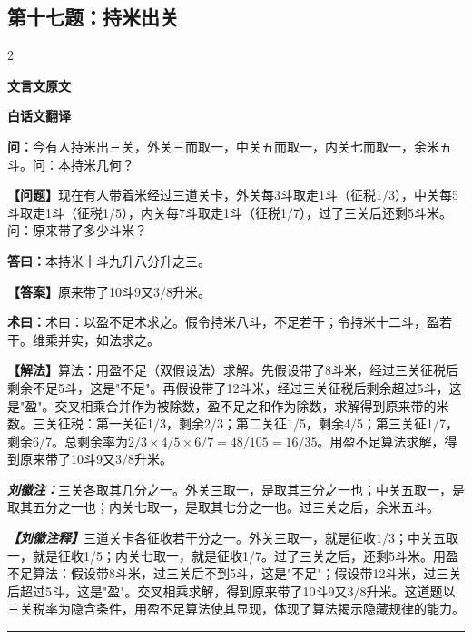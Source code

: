 \documentclass[10pt,a4paper]{article}
\newcommand{\wen}[1]{\textbf{\color{problemcolor}问：}#1\par}
\newcommand{\da}[1]{\textbf{答曰：}#1\par}
\newcommand{\shu}[1]{\textbf{术曰：}#1\par}
\newcommand{\liuhui}[1]{{\color{commentarycolor}\textit{\textbf{刘徽注：}}#1\par}}
\newcommand{\classicalheader}[1]{{\centering\large\bfseries\color{classicalcolor} #1\par\vspace{0.5em}}}
\newcommand{\wenmodern}[1]{\textbf{\color{moderncolor}【问题】}#1\par}
\newcommand{\damodern}[1]{\textbf{【答案】}#1\par}
\newcommand{\shumodern}[1]{\textbf{【解法】}#1\par}
\newcommand{\liuhuimodern}[1]{{\color{commentarycolor}\textit{\textbf{【刘徽注释】}}#1\par}}
\newcommand{\modernheader}[1]{{\centering\large\bfseries\color{moderncolor} #1\par\vspace{0.5em}}}
\newcommand{\problemsec}[1]{\subsection*{#1}}
\begin{document}
\problemsec{第十七题：持米出关}
\begin{paracol}{2}
\classicalheader{文言文原文}
\switchcolumn
\modernheader{白话文翻译}
\switchcolumn*

\wen{今有人持米出三关，外关三而取一，中关五而取一，内关七而取一，余米五斗。问：本持米几何？}

\switchcolumn

\wenmodern{现在有人带着米经过三道关卡，外关每3斗取走1斗（征税1/3），中关每5斗取走1斗（征税1/5），内关每7斗取走1斗（征税1/7），过了三关后还剩5斗米。问：原来带了多少斗米？}

\switchcolumn*

\da{本持米十斗九升八分升之三。}

\switchcolumn

\damodern{原来带了10斗9又3/8升米。}

\switchcolumn*

\shu{术曰：以盈不足术求之。假令持米八斗，不足若干；令持米十二斗，盈若干。维乘并实，如法求之。}

\switchcolumn

\shumodern{算法：用盈不足（双假设法）求解。先假设带了8斗米，经过三关征税后剩余不足5斗，这是"不足"。再假设带了12斗米，经过三关征税后剩余超过5斗，这是"盈"。交叉相乘合并作为被除数，盈不足之和作为除数，求解得到原来带的米数。三关征税：第一关征1/3，剩余2/3；第二关征1/5，剩余4/5；第三关征1/7，剩余6/7。总剩余率为$2/3 \times 4/5 \times 6/7 = 48/105 = 16/35$。用盈不足算法求解，得到原来带了10斗9又3/8升米。}

\switchcolumn*

\liuhui{三关各取其几分之一。外关三取一，是取其三分之一也；中关五取一，是取其五分之一也；内关七取一，是取其七分之一也。过三关之后，余米五斗。}

\switchcolumn

\liuhuimodern{三道关卡各征收若干分之一。外关三取一，就是征收1/3；中关五取一，就是征收1/5；内关七取一，就是征收1/7。过了三关之后，还剩5斗米。用盈不足算法：假设带8斗米，过三关后不到5斗，这是"不足"；假设带12斗米，过三关后超过5斗，这是"盈"。交叉相乘求解，得到原来带了10斗9又3/8升米。这道题以三关税率为隐含条件，用盈不足算法使其显现，体现了算法揭示隐藏规律的能力。}

\end{paracol}

\vspace{0.3cm}
\hrule
\vspace{0.3cm}
\end{document}
